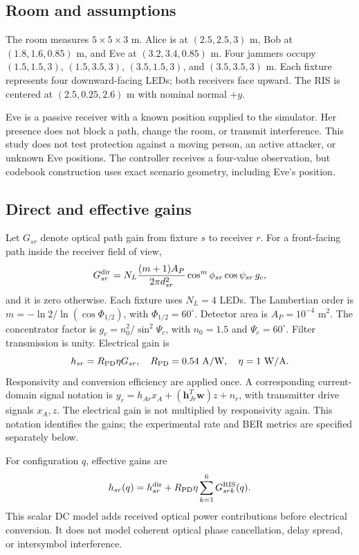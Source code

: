 \documentclass[journal,10pt,twocolumn]{IEEEtran}
\begin{document}
\subsection{Room and assumptions}
The room measures $5\times5\times3$ m. Alice is at $(2.5,2.5,3)$ m, Bob at $(1.8,1.6,0.85)$ m, and Eve at $(3.2,3.4,0.85)$ m. Four jammers occupy $(1.5,1.5,3)$, $(1.5,3.5,3)$, $(3.5,1.5,3)$, and $(3.5,3.5,3)$ m. Each fixture represents four downward-facing LEDs; both receivers face upward. The RIS is centered at $(2.5,0.25,2.6)$ m with nominal normal $+y$.

Eve is a passive receiver with a known position supplied to the simulator. Her presence does not block a path, change the room, or transmit interference. This study does not test protection against a moving person, an active attacker, or unknown Eve positions. The controller receives a four-value observation, but codebook construction uses exact scenario geometry, including Eve's position.

\subsection{Direct and effective gains}
Let $G_{sr}$ denote optical path gain from fixture $s$ to receiver $r$. For a front-facing path inside the receiver field of view,
\begin{equation}
G_{sr}^{\rm dir}=N_L\frac{(m+1)A_P}{2\pi d_{sr}^2}
\cos^m\phi_{sr}\cos\psi_{sr}\,g_c,
\label{eq:los}
\end{equation}
and it is zero otherwise. Each fixture uses $N_L=4$ LEDs. The Lambertian order is $m=-\ln2/\ln(\cos\Phi_{1/2})$, with $\Phi_{1/2}=60^\circ$. Detector area is $A_P=10^{-4}$ m$^2$. The concentrator factor is $g_c=n_0^2/\sin^2\Psi_c$, with $n_0=1.5$ and $\Psi_c=60^\circ$. Filter transmission is unity. Electrical gain is
\begin{equation}
h_{sr}=R_{\rm PD}\eta G_{sr},\quad
R_{\rm PD}=0.54\ {\rm A/W},\quad\eta=1\ {\rm W/A}.
\label{eq:conversion}
\end{equation}
Responsivity and conversion efficiency are applied once. A corresponding current-domain signal notation is $y_r=h_{Ar}x_A+(\mathbf h_{Jr}^{T}\mathbf w)z+n_r$, with transmitter drive signals $x_A,z$. The electrical gain is not multiplied by responsivity again. This notation identifies the gains; the experimental rate and BER metrics are specified separately below.

For configuration $q$, effective gains are
\begin{equation}
h_{sr}(q)=h_{sr}^{\rm dir}
+R_{\rm PD}\eta\sum_{k=1}^{6}G_{srk}^{\rm RIS}(q).
\label{eq:effective}
\end{equation}
This scalar DC model adds received optical power contributions before electrical conversion. It does not model coherent optical phase cancellation, delay spread, or intersymbol interference.
\end{document}
